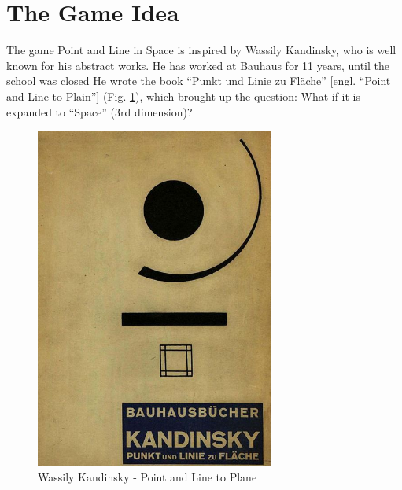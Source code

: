 



\usepackage{chngcntr}




%


\thispagestyle{plain}
\pagestyle{plain}

\tableofcontents

\listoffigures

\section{The Game Idea}


The game Point and Line in Space is inspired by Wassily Kandinsky, who is well known for his abstract works.
He has worked at Bauhaus for 11 years, until the school was closed
He wrote the book ``Punkt und Linie zu Fläche'' [engl. ``Point and Line to Plain''] (Fig. \ref{fig:PointAndLineToPlane}), which brought up the question:
What if it is expanded to ``Space'' (3rd dimension)?

\begin{figure}[htbp]
	\centering
		\includegraphics[width=0.70\textwidth]{img/PointAndLineToPlane.jpg}
	\caption[Point and Line to Plane]{Wassily Kandinsky - Point and Line to Plane}
	\label{fig:PointAndLineToPlane}
\end{figure}

